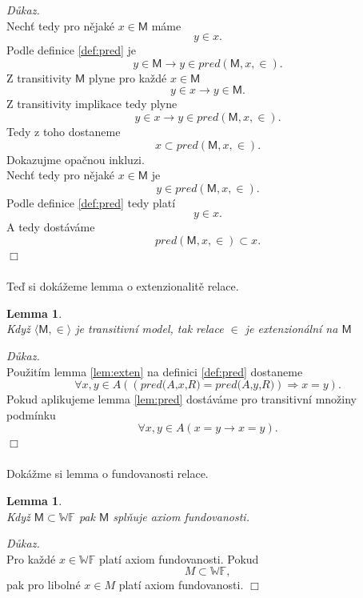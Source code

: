 \documentclass[12pt,a4paper]{article}
\newtheorem{lemma}[veta]{Lemma}
\newenvironment{proof}
{\noindent \textit{D\r{u}kaz.}}
{\hspace*{\fill} $\Box$}
\begin{document}
\begin{proof}
~\\
Nech\v{t} tedy pro n\v{e}jak\'{e} $  x \in \mathsf{M}  $ m\'{a}me \[ y \in x  .\] 
Podle definice \ref{def:pred} je  \[ y \in \mathsf{M} \rightarrow y \in \mathit{pred(\mathsf{M},x,\in)} .\] 
Z transitivity $ \textsf{M} $  plyne pro ka\v{z}d\'{e}  $ x \in \textsf{M} $
\[ y \in x \rightarrow y \in   \textsf{M} . \]
Z transitivity implikace tedy plyne 
\[ y \in x \rightarrow y \in \mathit{pred(\mathsf{M},x,\in)}  .\]
Tedy z toho dostaneme \[ x \subset \mathit{pred(\mathsf{M},x,\in)}  .\]
Dokazujme opa\v{c}nou inkluzi. \\ 
Nech\v{t} tedy pro n\v{e}jak\'{e}  $  x \in \mathsf{M}$ je \[  y \in \mathit{pred( \mathsf{M},x,\in)} .\] Podle definice \ref{def:pred} tedy plat\'{i}  \[ y \in x  .\]
A tedy dost\'{a}v\'{a}me \[ \mathit{pred(\mathsf{M},x,\in)} \subset x .\]
\end{proof}~\\~\\
Te\v{d} si dok\'{a}\v{z}eme lemma o extenzionalit\v{e} relace.
\begin{lemma}
~\\
\label{lem:ext}
Kdy\v{z} $  \langle \textsf{M},\in \rangle  $ je transitivn\'{i} model, tak relace $\in$ je extenzion\'{a}ln\'{i} na  $  \textsf{M} $ 
\end{lemma}
\begin{proof}~\\
Pou\v{z}it\'{i}m lemma \ref{lem:exten} na definici \ref{def:pred} dostaneme \[  \forall x,y \in A( (\textit{pred(A,x,R)} =  \textit{pred(A,y,R)})\Rightarrow x=y ) .\] Pokud aplikujeme lemma \ref{lem:pred}  dost\'{a}v\'{a}me pro transitivn\'{i} mno\v{z}iny podm\'{i}nku
\[ \forall x,y \in A(x = y \rightarrow x=y) .\]
\end{proof}~\\~\\
Dok\'{a}\v{z}me si lemma o fundovanosti relace.
\begin{lemma}
~\\
Kdy\v{z} $  \textsf{M}  \subset  \mathbb{WF} $ pak  $ \textsf{M} $ spl\v{n}uje axiom fundovanosti.
\label{lem:fund}
\end{lemma}
\begin{proof}~\\
Pro ka\v{z}d\'{e} $ x \in \mathbb{WF} $ plat\'{i} axiom fundovanosti. Pokud \[  M \subset  \mathbb{WF}  ,\] pak pro liboln\'{e} $ x \in M $ plat\'{i} axiom fundovanosti.
\end{proof}~\\~\\
\end{document}
